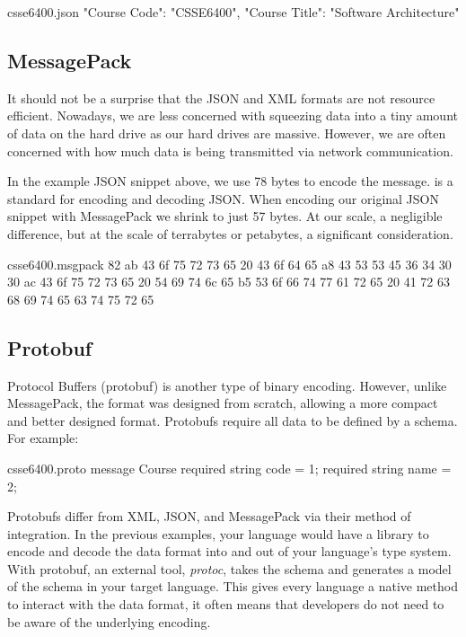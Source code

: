 \documentclass{csse4400}
\begin{document}
\begin{code}[language=json]{csse6400.json}
{
    "Course Code": "CSSE6400",
    "Course Title": "Software Architecture"
}
\end{code}

\subsection{MessagePack}
It should not be a surprise that the JSON and XML formats are not resource efficient.
Nowadays, we are less concerned with squeezing data into a tiny amount of data on the hard drive as our hard drives are massive.
However, we are often concerned with how much data is being transmitted via network communication.

In the example JSON snippet above, we use 78 bytes to encode the message.
 is a standard for encoding and decoding JSON.
When encoding our original JSON snippet with MessagePack we shrink to just 57 bytes.
At our scale, a negligible difference,
but at the scale of terrabytes or petabytes,
a significant consideration.

\begin{code}[]{csse6400.msgpack}
82 ab 43 6f 75 72 73 65 20 43 6f 64 65 a8 43 53 53 45 36 34 30 30 ac 43 6f 75 72 73 65 20 54 69 74 6c 65 b5 53 6f 66 74 77 61 72 65 20 41 72 63 68 69 74 65 63 74 75 72 65
\end{code}


\subsection{Protobuf}
Protocol Buffers (protobuf) is another type of binary encoding.
However, unlike MessagePack, the format was designed from scratch,
allowing a more compact and better designed format.
Protobufs require all data to be defined by a schema.
For example:

\begin{code}[language=protobuf]{csse6400.proto}
message Course {
    required string code = 1;
    required string name = 2;
}
\end{code}

Protobufs differ from XML, JSON, and MessagePack via their method of integration.
In the previous examples,
your language would have a library to encode and decode the data format into and out of your language's type system.
With protobuf, an external tool, \textsl{protoc},
takes the schema and generates a model of the schema in your target language.
This gives every language a native method to interact with the data format,
it often means that developers do not need to be aware of the underlying encoding.
\end{document}
